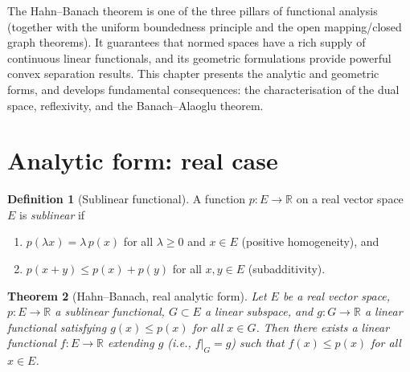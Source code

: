 \documentclass[a4paper,12pt]{book}
\newcommand{\R}{\mathbb{R}}
\theoremstyle{definition}
\newtheorem{definition}{Definition}[chapter]
\theoremstyle{plain}
\newtheorem{theorem}[definition]{Theorem}
\theoremstyle{remark}
\begin{document}
\vspace{1em}

The Hahn--Banach theorem is one of the three pillars of functional analysis (together
with the uniform boundedness principle and the open mapping/closed graph theorems).
It guarantees that normed spaces have a rich supply of continuous linear
functionals, and its geometric formulations provide powerful convex separation
results. This chapter presents the analytic and geometric forms, and develops
fundamental consequences: the characterisation of the dual space, reflexivity,
and the Banach--Alaoglu theorem.

\section{Analytic form: real case}

\begin{definition}[Sublinear functional]\label{def:sublinear}
A function $p\colon E\to\R$ on a real vector space $E$ is \emph{sublinear} if
\begin{enumerate}[label=(\roman*)]
  \item $p(\lambda x) = \lambda\, p(x)$ for all $\lambda\geq 0$ and $x\in E$
        (positive homogeneity), and
  \item $p(x+y)\leq p(x)+p(y)$ for all $x,y\in E$ (subadditivity).
\end{enumerate}
\end{definition}

\begin{theorem}[Hahn--Banach, real analytic form]\label{thm:HB-real}
Let $E$ be a real vector space, $p\colon E\to\R$ a sublinear functional,
$G\subset E$ a linear subspace, and $g\colon G\to\R$ a linear functional
satisfying $g(x)\leq p(x)$ for all $x\in G$. Then there exists a linear
functional $f\colon E\to\R$ extending $g$ (i.e., $f|_G=g$) such that
$f(x)\leq p(x)$ for all $x\in E$.
\end{theorem}
\end{document}
